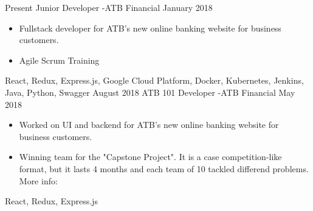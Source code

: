 
\begin{experiences}
  \experience
    {Present}   {Junior Developer -}{ATB Financial}{}
    {January 2018} {
                      \begin{itemize}
                        \item Fullstack developer for ATB's new online banking website for business customers.
                        \item Agile Scrum Training
                      \end{itemize}
                    }
                    {
                        React,
                        Redux,
                        Express.js,
                        Google Cloud Platform,
                        Docker,
                        Kubernetes,
                        Jenkins,
                        Java,
                        Python,
                        Swagger
                    }
  \emptySeparator
  \experience
  {August 2018}   {ATB 101 Developer -}{ATB Financial}{}
  {May 2018} {
                    \begin{itemize}
                      \item Worked on UI and backend for ATB's new online banking website for business customers.
                      \item Winning team for the "Capstone Project". It is a case competition-like format,
                      but it lasts 4 months and each team of 10 tackled differend problems.
                      More info: 
                    \end{itemize}
                  }
                  {
                      React,
                      Redux,
                      Express.js
                  }
\end{experiences}